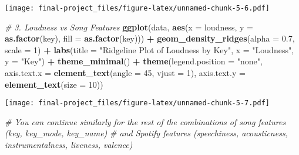 \documentclass[
]{article}
\newenvironment{Shaded}{\begin{snugshade}}{\end{snugshade}}
\newcommand{\AttributeTok}[1]{\textcolor[rgb]{0.13,0.29,0.53}{#1}}
\newcommand{\CommentTok}[1]{\textcolor[rgb]{0.56,0.35,0.01}{\textit{#1}}}
\newcommand{\DecValTok}[1]{\textcolor[rgb]{0.00,0.00,0.81}{#1}}
\newcommand{\FloatTok}[1]{\textcolor[rgb]{0.00,0.00,0.81}{#1}}
\newcommand{\FunctionTok}[1]{\textcolor[rgb]{0.13,0.29,0.53}{\textbf{#1}}}
\newcommand{\NormalTok}[1]{#1}
\newcommand{\SpecialCharTok}[1]{\textcolor[rgb]{0.81,0.36,0.00}{\textbf{#1}}}
\newcommand{\StringTok}[1]{\textcolor[rgb]{0.31,0.60,0.02}{#1}}
\begin{document}
\texttt{[image: final-project\_files/figure-latex/unnamed-chunk-5-6.pdf]}

\begin{Shaded}
\begin{Highlighting}[]
\CommentTok{\# 3. Loudness vs Song Features}
\FunctionTok{ggplot}\NormalTok{(data, }\FunctionTok{aes}\NormalTok{(}\AttributeTok{x =}\NormalTok{ loudness, }\AttributeTok{y =} \FunctionTok{as.factor}\NormalTok{(key), }\AttributeTok{fill =} \FunctionTok{as.factor}\NormalTok{(key))) }\SpecialCharTok{+}
  \FunctionTok{geom\_density\_ridges}\NormalTok{(}\AttributeTok{alpha =} \FloatTok{0.7}\NormalTok{, }\AttributeTok{scale =} \DecValTok{1}\NormalTok{) }\SpecialCharTok{+}
  \FunctionTok{labs}\NormalTok{(}\AttributeTok{title =} \StringTok{"Ridgeline Plot of Loudness by Key"}\NormalTok{,}
       \AttributeTok{x =} \StringTok{"Loudness"}\NormalTok{,}
       \AttributeTok{y =} \StringTok{"Key"}\NormalTok{) }\SpecialCharTok{+}
  \FunctionTok{theme\_minimal}\NormalTok{() }\SpecialCharTok{+}
  \FunctionTok{theme}\NormalTok{(}\AttributeTok{legend.position =} \StringTok{"none"}\NormalTok{, }
        \AttributeTok{axis.text.x =} \FunctionTok{element\_text}\NormalTok{(}\AttributeTok{angle =} \DecValTok{45}\NormalTok{, }\AttributeTok{vjust =} \DecValTok{1}\NormalTok{),}
        \AttributeTok{axis.text.y =} \FunctionTok{element\_text}\NormalTok{(}\AttributeTok{size =} \DecValTok{10}\NormalTok{))}
\end{Highlighting}
\end{Shaded}

\texttt{[image: final-project\_files/figure-latex/unnamed-chunk-5-7.pdf]}

\begin{Shaded}
\begin{Highlighting}[]
\CommentTok{\# You can continue similarly for the rest of the combinations of song features (key, key\_mode, key\_name)}
\CommentTok{\# and Spotify features (speechiness, acousticness, instrumentalness, liveness, valence)}
\end{Highlighting}
\end{Shaded}
\end{document}
